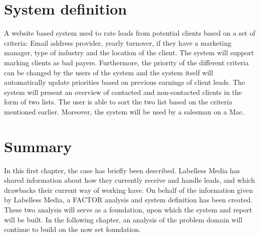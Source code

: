 \section{System definition}
A website based system used to rate leads from potential clients based on a set of criteria: Email address provider, yearly turnover, if they have a marketing manager, type of industry and the location of the client.
The system will support marking clients as bad payers.
Furthermore, the priority of the different criteria can be changed by the users of the system and the system itself will automatically update priorities based on previous earnings of client leads. The system will present an overview of contacted and non-contacted clients in the form of two lists. The user is able to sort the two list based on the criteria mentioned earlier. Moreover, the system will be used by a salesman on a Mac.

\section{Summary}
In this first chapter, the case has briefly been described. Labelless Media has shared information about how they currently receive and handle leads, and which drawbacks their current way of working have. On behalf of the information given by Labelless Media, a FACTOR analysis and system definition has been created. These two analysis will serve as a foundation, upon which the system and report will be built. In the following chapter, an analysis of the problem domain will continue to build on the now set foundation.  